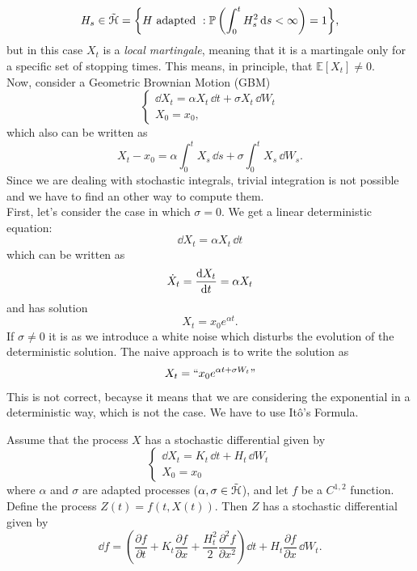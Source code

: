 \begin{equation*}
    H_s \in \Tilde{\mathcal{H}} = \bigg\{H\mbox{ adapted }: \mathbb{P}\left(\int_0^t H^2_s\,\dd s <\infty\right)=1\bigg\},
\end{equation*}
but in this case $X_t$ is a \emph{local martingale}, meaning that it is a martingale only for a specific set of stopping times. This means, in principle, that $\mathbb{E}[X_t]\ne0$.\\
Now, consider a Geometric Brownian Motion (GBM)
\begin{equation}
    \begin{cases}
    \dd X_t = \alpha X_t\, \dd t + \sigma X_t\, \dd W_t\\
    X_0 = x_0,
    \end{cases}
\end{equation}
which also can be written as
\begin{equation}
    X_t - x_0 = \alpha\int^t_0 X_s\, \dd s + \sigma\int^t_0 X_s \,\dd W_s.
\end{equation}
Since we are dealing with stochastic integrals, trivial integration is not possible and we have to find an other way to compute them. \\
First, let's consider the case in which $\sigma=0$. We get a linear deterministic equation:
\begin{equation}
    \dd X_t = \alpha X_t\, \dd t
\end{equation}
which can be written as
\begin{equation}
    \Dot{X}_t = \dv{X_t}{t} = \alpha X_t
\end{equation}
and has solution
\begin{equation}\label{detsol}
    X_t = x_0e^{\alpha t}.
\end{equation}
If $\sigma\ne0$ it is as we introduce a white noise which disturbs the evolution of the deterministic solution. The naive approach is to write the solution as
\begin{equation}
    X_t = ``x_0e^{\alpha t + \sigma W_t}"
\end{equation}
This is not correct, becayse it means that we are considering the exponential in a deterministic way, which is not the case. We have to use Itô's Formula.
\begin{theorem}
    Assume that the process $X$ has a stochastic differential given by
    \begin{equation}
    \begin{cases}
        \dd X_t = K_t\, \dd t + H_t\, \dd W_t\\
        X_0 = x_0
    \end{cases}
    \end{equation}
    where $\alpha$ and $\sigma$ are adapted processes ($\alpha,\sigma\in\Tilde{\mathcal{H}}$), and let $f$ be a $C^{1,2}$ function. Define the process $Z(t) = f(t,X(t))$. Then $Z$ has a stochastic differential given by
    \begin{equation}\label{ito}
        \dd f=\left({\frac{\partial f}{\partial t}}+K_{t}{\frac {\partial f}{\partial x}}+{\frac{H_{t}^{2}}{2}}{\frac{\partial ^{2}f}{\partial x^{2}}}\right)\dd t+H_{t}{\frac{\partial f}{\partial x}}\,\dd W_{t}.
    \end{equation}
\end{theorem}
